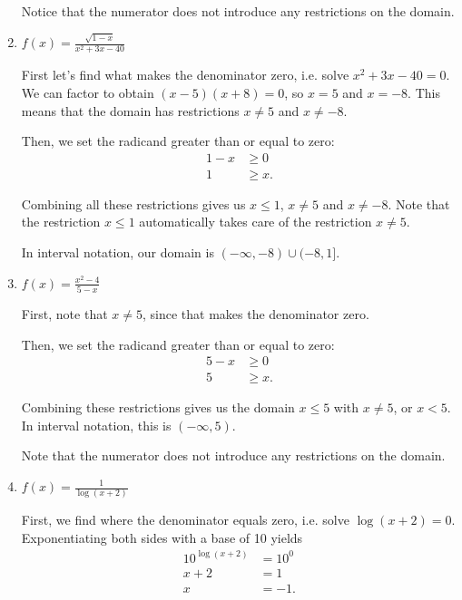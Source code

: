 \documentclass{ximera}
\begin{document}
\begin{enumerate}
\begin{explanation}
\begin{expandable}
Notice that the numerator does not introduce any restrictions on the domain. 
			\end{expandable}
		\end{explanation}
	\item $f(x) = \frac{\sqrt{1-x}}{x^2 + 3x - 40}$
		\begin{explanation}
			\begin{expandable}
First let's find what makes the denominator zero, i.e. solve $x^2 + 3x - 40 = 0$. We can factor to obtain $(x - 5)(x + 8) = 0$, so $x = 5$ and $x = -8$. This means that the domain has restrictions $x \ne 5$ and $x \ne -8$. 

Then, we set the radicand greater than or equal to zero: \begin{align*}1 - x&\ge 0 \\ 1 & \ge x. \end{align*}

Combining all these restrictions gives us $x \le 1$, $x \ne 5$ and $x \ne -8$. Note that the restriction $x \le 1$ automatically takes care of the restriction $x \ne 5$. 

In interval notation, our domain is $(- \infty, -8) \cup (-8, 1]$. 
			\end{expandable}
		\end{explanation}
	\item $f(x) = \frac{x^2 - 4}{5 - x}$
		\begin{explanation}
			\begin{expandable}
First, note that $x \ne 5$, since that makes the denominator zero.

Then, we set the radicand greater than or equal to zero: \begin{align*}5 - x&\ge 0 \\ 5 & \ge x. \end{align*}

Combining these restrictions gives us the domain $x \le 5$ with $x \ne 5$, or $x < 5$. In interval notation, this is $(-\infty, 5)$.

Note that the numerator does not introduce any restrictions on the domain. 
			\end{expandable}
		\end{explanation}
	\item $f(x) = \frac{1}{\log(x + 2)}$
		\begin{explanation}
			\begin{expandable}
First, we find where the denominator equals zero, i.e. solve $\log(x + 2) = 0$. Exponentiating both sides with a base of 10 yields \begin{align*}10^{\log(x + 2)} & = 10^0 \\ x + 2 & = 1 \\ x & = -1. \end{align*}


\end{expandable}
\end{explanation}
\end{enumerate}
\end{document}
